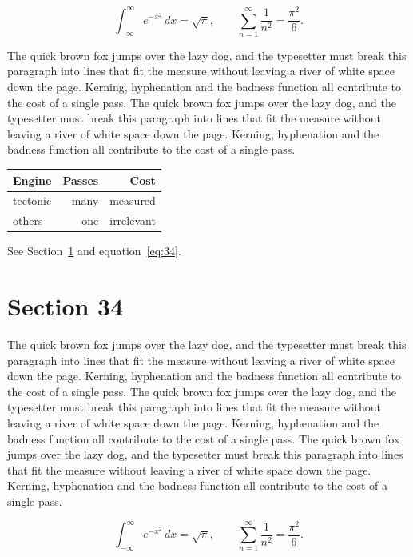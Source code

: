 \documentclass{article}
\begin{document}
\begin{equation}\label{eq:33}
\int_{-\infty}^{\infty} e^{-x^{2}}\,dx = \sqrt{\pi}, \qquad
\sum_{n=1}^{\infty} \frac{1}{n^{2}} = \frac{\pi^{2}}{6}.
\end{equation}

The quick brown fox jumps over the lazy dog, and the typesetter must break this paragraph into lines that fit the measure without leaving a river of white space down the page. Kerning, hyphenation and the badness function all contribute to the cost of a single pass. The quick brown fox jumps over the lazy dog, and the typesetter must break this paragraph into lines that fit the measure without leaving a river of white space down the page. Kerning, hyphenation and the badness function all contribute to the cost of a single pass. 

\begin{center}
\begin{tabular}{lrr}
\toprule
Engine & Passes & Cost \\
\midrule
tectonic & many & measured \\
others & one & irrelevant \\
\bottomrule
\end{tabular}
\end{center}

See Section~\ref{sec:34} and equation~\eqref{eq:34}.
\section{Section 34}
\label{sec:34}
The quick brown fox jumps over the lazy dog, and the typesetter must break this paragraph into lines that fit the measure without leaving a river of white space down the page. Kerning, hyphenation and the badness function all contribute to the cost of a single pass. The quick brown fox jumps over the lazy dog, and the typesetter must break this paragraph into lines that fit the measure without leaving a river of white space down the page. Kerning, hyphenation and the badness function all contribute to the cost of a single pass. The quick brown fox jumps over the lazy dog, and the typesetter must break this paragraph into lines that fit the measure without leaving a river of white space down the page. Kerning, hyphenation and the badness function all contribute to the cost of a single pass. 

\begin{equation}\label{eq:34}
\int_{-\infty}^{\infty} e^{-x^{2}}\,dx = \sqrt{\pi}, \qquad
\sum_{n=1}^{\infty} \frac{1}{n^{2}} = \frac{\pi^{2}}{6}.
\end{equation}
\end{document}
